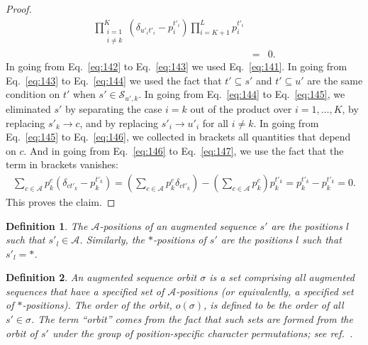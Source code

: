 \documentclass{article}
\numberwithin{myclaim}{section}
\newcommand{\eq}[1]{Eq.\ \ref{#1}}
\newtheorem{definition}{Definition}
\begin{document}
\begin{proof}
\begin{eqnarray}
        \prod_{\substack{i=1 \\ i \neq k}}^K\!\! \left(\delta_{u'_i t'_i} - p^{t'_i}_i \right) 
        \prod_{i=K+1}^L p^{t'_i}_i \label{eq:146} \\
    &=& 0 \label{eq:147}.
\end{eqnarray}
In going from \eq{eq:142} to \eq{eq:143} we used \eq{eq:141}. In going from \eq{eq:143} to \eq{eq:144} we used the fact that $t'\subseteq s'$ and $t'\subseteq u'$ are the same condition on $t'$ when $s' \in \mathcal{S}_{u',k}$. In going from \eq{eq:144} to \eq{eq:145}, we eliminated $s'$ by separating the case $i=k$ out of the product over $i = 1, \ldots, K$, by replacing $s'_k \to c$, and by replacing $s'_i \to u'_i$ for all $i \neq k$. In going from \eq{eq:145} to \eq{eq:146}, we collected in brackets all quantities that depend on $c$. And in going from \eq{eq:146} to \eq{eq:147}, we use the fact that the term in brackets vanishes: 
\begin{eqnarray}
    \sum_{c \in \mathcal{A}} p_k^c \left( \delta_{c t'_k} - p_k^{t'_k} \right) 
    = \left( \sum_{c \in \mathcal{A}} p_k^c \delta_{c t'_k} \right) - \left(  \sum_{c \in \mathcal{A}} p_k^c \right) p_k^{t'_k}
    = p_k^{t'_k} -  p_k^{t'_k} 
    = 0. 
\end{eqnarray}
This proves the claim.
\end{proof}

\begin{definition}
The $\mathcal{A}$-positions of an augmented sequence $s'$ are the positions $l$ such that $s'_l \in \mathcal{A}$. Similarly, the $*$-positions of $s'$ are the positions $l$ such that $s'_l = *$. 
\end{definition}

\begin{definition} An augmented sequence orbit $\sigma$ is a set comprising all augmented sequences that have a specified set of $\mathcal{A}$-positions (or equivalently, a specified set of $*$-positions). The order of the orbit, $o(\sigma)$, is defined to be the order of all $s' \in \sigma$. The term ``orbit'' comes from the fact that such sets are formed from the orbit of $s'$ under the group of position-specific character permutations; see ref.\ \cite{Posfai:2024bb}.
\end{definition}

\end{document}
